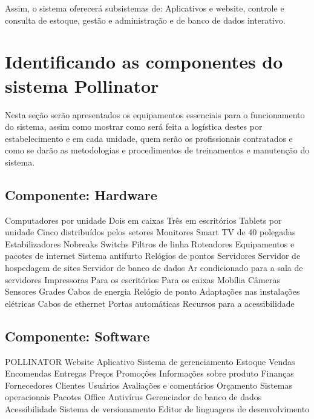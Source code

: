         Assim, o sistema oferecerá subsistemas de: Aplicativos e website, controle e consulta de estoque, gestão e administração e de banco de dados interativo.

 \section{Identificando as componentes do sistema Pollinator}
Nesta seção serão apresentados os equipamentos essenciais para o funcionamento do sistema, assim como mostrar como será feita a logística destes por estabelecimento e em cada unidade, quem serão os profissionais contratados e como se darão as metodologias e procedimentos de treinamentos e manutenção do sistema.


     \subsection{Componente: Hardware}
	 \begin{outline}
           \1 Computadores por unidade
	 	\2  Dois em caixas
		\2  Três em escritórios 
	\1 Tablets por unidade
		 \2 Cinco distribuídos pelos setores
	\1 Monitores %
	\1 Smart TV de 40 polegadas
	\1 Estabilizadores	
	\1 Nobreaks 
	\1 Switchs
	\1 Filtros de linha
	\1 Roteadores 
	\1 Equipamentos e pacotes de internet
	\1 Sistema antifurto
	\1 Relógios de pontos
	\1 Servidores
		\2 Servidor de hospedagem de sites
		\2 Servidor de banco de dados
	\1 Ar condicionado para a sala de servidores
	\1 Impressoras
		\2 Para os escritórios
		\2 Para os caixas
	\1 Mobília
	\1 Câmeras
	\1 Sensores
	\1 Grades 
	\1 Cabos de energia 
	\1 Relógio de ponto
	\1 Adaptações nas instalações elétricas 
	\1 Cabos de ethernet 
	\1 Portas automáticas
	\1 Recursos para a acessibilidade 
	 \end{outline}

     \subsection{Componente: Software}
	\begin{outline}
	\1 POLLINATOR %
		\2 Website
		\2 Aplicativo
		\2 Sistema de gerenciamento
			\3 Estoque
			\3 Vendas
			\3 Encomendas
			\3 Entregas
			\3 Preços
			\3 Promoções
			\3 Informações sobre produto
			\3 Finanças
			\3 Fornecedores
			\3 Clientes
			\3 Usuários
			\3 Avaliações e comentários
			\3 Orçamento
	\1 Sistemas operacionais
	\1 Pacotes Office
	\1 Antivírus
	\1 Gerenciador de banco de dados
	\1 Acessibilidade 
	\1 Sistema de versionamento %
	\1 Editor de linguagens de desenvolvimento	
	 \end{outline}

